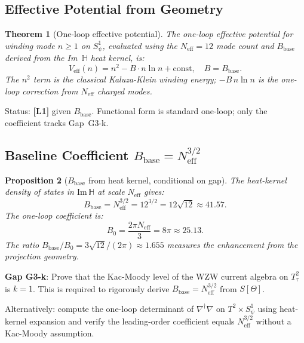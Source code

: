 \documentclass[12pt,a4paper]{article}
\newtheorem{theorem}{Theorem}[section]
\newtheorem{proposition}[theorem]{Proposition}
\theoremstyle{definition}
\theoremstyle{remark}
\begin{document}
\subsection{Effective Potential from Geometry}

\begin{theorem}[One-loop effective potential]
\label{thm:g5:Veff}
The one-loop effective potential for winding mode $n \ge 1$ on $S^1_\psi$,
evaluated using the $N_\mathrm{eff} = 12$ mode count and $B_\mathrm{base}$ derived
from the Im~$\mathbb{H}$ heat kernel, is:
\begin{equation}
  V_\mathrm{eff}(n) = n^2 - B \cdot n\ln n + \mathrm{const},
  \quad B = B_\mathrm{base}.
  \label{eq:g5:Veff}
\end{equation}
The $n^2$ term is the classical Kaluza-Klein winding energy; $-B\,n\ln n$ is the
one-loop correction from $N_\mathrm{eff}$ charged modes.
\end{theorem}

\begin{resultbox}
Status: \textbf{[L1]} given $B_\mathrm{base}$.  Functional form is standard
one-loop; only the coefficient tracks Gap~G3-k.
\end{resultbox}

\subsection{Baseline Coefficient $B_\mathrm{base} = N_\mathrm{eff}^{3/2}$}

\begin{proposition}[$B_\mathrm{base}$ from heat kernel, conditional on gap]
\label{prop:g5:Bbase}
The heat-kernel density of states in $\mathrm{Im}\,\mathbb{H}$ at scale $N_\mathrm{eff}$
gives:
\begin{equation}
  B_\mathrm{base} = N_\mathrm{eff}^{3/2} = 12^{3/2} = 12\sqrt{12} \approx 41.57.
  \label{eq:g5:Bbase}
\end{equation}
The one-loop coefficient is:
\begin{equation}
  B_0 = \frac{2\pi N_\mathrm{eff}}{3} = 8\pi \approx 25.13.
  \label{eq:g5:B0}
\end{equation}
The ratio $B_\mathrm{base}/B_0 = 3\sqrt{12}/(2\pi) \approx 1.655$ measures the
enhancement from the projection geometry.
\end{proposition}

\begin{gapbox}
\textbf{Gap G3-k}: Prove that the Kac-Moody level of the WZW current algebra on
$T^2_\tau$ is $k = 1$.  This is required to rigorously derive
$B_\mathrm{base} = N_\mathrm{eff}^{3/2}$ from $S[\Theta]$.

Alternatively: compute the one-loop determinant of $\nabla^\dagger\nabla$ on
$T^2\times S^1_\psi$ using heat-kernel expansion and verify the leading-order
coefficient equals $N_\mathrm{eff}^{3/2}$ without a Kac-Moody assumption.
\end{gapbox}
\end{document}
